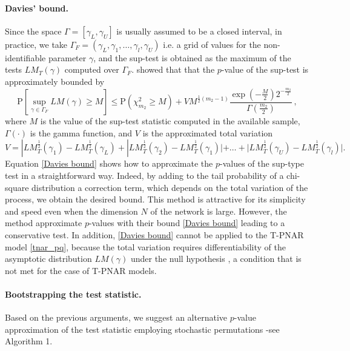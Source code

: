 \paragraph{Davies' bound.} Since the space $\Gamma=[\gamma_L, \gamma_U]$ is usually assumed to be  a closed interval, in practice, we take  $\Gamma_F=(\gamma_L,\gamma_1,\dots,\gamma_l,\gamma_U)$ i.e.  a grid of values for the non-identifiable parameter $\gamma$, and the sup-test is obtained as the maximum of the tests $LM_T(\gamma)$ computed over $\Gamma_F$. \cite{davies_1987} showed that that the $p$-value of the sup-test is approximately bounded by
\begin{equation}
	\mathrm{P}\left[ \sup_{\gamma\in\Gamma_F} LM(\gamma) \geq M\right] \leq \mathrm{P}(\chi^2_{m_2}\geq M)+VM^{\frac{1}{2}(m_2-1)}\frac{\exp(-\frac{M}{2})2^{-\frac{m_2}{2}}}{\Gamma(\frac{m_2}{2})}\,, \label{Davies bound}
\end{equation}
where $M$ is the value of the sup-test statistic  computed in the available sample,  $\Gamma(\cdot)$ is the gamma function, and $V$ is the approximated total variation
\begin{equation}
	V=
	|LM_T^{\frac{1}{2}}(\gamma_1)-LM_T^{\frac{1}{2}}(\gamma_L)+|LM_T^{\frac{1}{2}}(\gamma_2)-LM_T^{\frac{1}{2}}(\gamma_1)|+ \dots + |LM_T^{\frac{1}{2}}(\gamma_U)-LM_T^{\frac{1}{2}}(\gamma_l)|. \nonumber
\end{equation}
Equation \eqref{Davies bound} shows how  to approximate the $p$-values of the sup-type test in a straightforward way. Indeed, by adding to the tail probability of a chi-square distribution a correction term, which depends on the total variation of the process, we obtain the desired bound.  This  method is attractive for its simplicity and speed even when the dimension $N$ of the network is large. 
However, the method approximate $p$-values with their bound \eqref{Davies bound} leading to a conservative test. 
In addition,  \eqref{Davies bound} cannot be applied to  the T-PNAR model \eqref{tnar_pq}, because the total variation  requires differentiability of the asymptotic distribution $LM(\gamma)$ under the null hypothesis \cite[p.~36]{davies_1987}, a condition that is not met  for  the case of T-PNAR models. 

\paragraph{Bootstrapping the test statistic.} Based on the previous arguments, we suggest an alternative $p$-value approximation of the test statistic employing stochastic permutations \citep{hansen_1996,armillotta_fokianos_2022_testing}-see Algorithm 1. 


